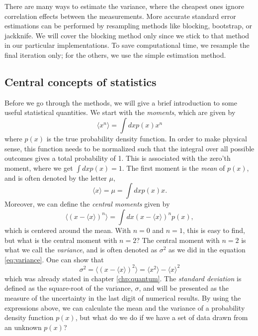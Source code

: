 There are many ways to estimate the variance, where the cheapest ones ignore correlation effects between the measurements. More accurate standard error estimations can be performed by resampling methods like blocking, bootstrap, or jackknife. We will cover the blocking method only since we stick to that method in our particular implementations. To save computational time, we resample the final iteration only; for the others, we use the simple estimation method.

\subsection{Central concepts of statistics}
Before we go through the methods, we will give a brief introduction to some useful statistical quantities. We start with the \textit{moments}, which are given by
\begin{equation*}
\langle x^n\rangle=\int dxp(x)x^n
\end{equation*}
where $p(x)$ is the true probability density function. In order to make physical sense, this function needs to be normalized such that the integral over all possible outcomes gives a total probability of 1. This is associated with the zero'th moment, where we get $\int dxp(x)=1$. The first moment is the \textit{mean} of $p(x)$, and is often denoted by the letter $\mu$,
\begin{equation}
\langle x\rangle=\mu=\int dxp(x)x.
\end{equation}
Moreover, we can define the \textit{central moments} given by
\begin{equation}
\langle(x-\langle x\rangle)^n\rangle=\int dx(x-\langle x\rangle)^np(x),
\end{equation}
which is centered around the mean. With $n=0$ and $n=1$, this is easy to find, but what is the central moment with $n=2$? The central moment with $n=2$ is what we call the \textit{variance}, and is often denoted as $\sigma^2$ as we did in the equation \eqref{eq:variance}. One can show that
\begin{equation}
\sigma^2=\langle(x-\langle x\rangle)^2\rangle=\langle x^2\rangle - \langle x \rangle^2
\label{eq:variance2}
\end{equation}
which was already stated in chapter \ref{chp:quantum}. The \textit{standard deviation} is defined as the square-root of the variance, $\sigma$, and will be presented as the measure of the uncertainty in the last digit of numerical results. By using the expressions above, we can calculate the mean and the variance of a probability density function $p(x)$, but what do we do if we have a set of data drawn from an unknown $p(x)$?

